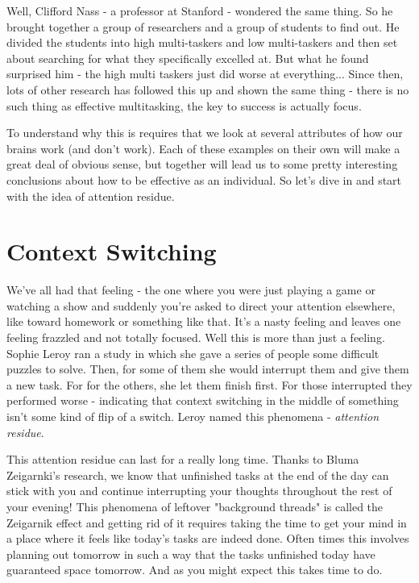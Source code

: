 \documentclass[11pt,a5paper]{book}
\begin{document}
Well, Clifford Nass - a professor at Stanford - wondered the same thing. So he brought together a group of researchers and a group of students to find out. He divided the students into high multi-taskers and low multi-taskers and then set about searching for what they specifically excelled at. But what he found surprised him - the high multi taskers just did worse at everything... Since then, lots of other research has followed this up and shown the same thing - there is no such thing as effective multitasking, the key to success is actually focus. \cite{keller}
\newline

To understand why this is requires that we look at several attributes of how our brains work (and don't work). Each of these examples on their own will make a great deal of obvious sense, but together will lead us to some pretty interesting conclusions about how to be effective as an individual. So let's dive in and start with the idea of attention residue.

\section{Context Switching}

We've all had that feeling - the one where you were just playing a game or watching a show and suddenly you're asked to direct your attention elsewhere, like toward homework or something like that. It's a nasty feeling and leaves one feeling frazzled and not totally focused. Well this is more than just a feeling. Sophie Leroy ran a study in which she gave a series of people some difficult puzzles to solve. Then, for some of them she would interrupt them and give them a new task. For for the others, she let them finish first. For those interrupted they performed worse - indicating that context switching in the middle of something isn't some kind of flip of a switch. Leroy named this phenomena - \textit{attention residue}. 
\newline

This attention residue can last for a really long time. Thanks to Bluma Zeigarnki's research, we know that unfinished tasks at the end of the day can stick with you and continue interrupting your thoughts throughout the rest of your evening! This phenomena of leftover "background threads" is called the Zeigarnik effect \cite{newport} and getting rid of it requires taking the time to get your mind in a place where it feels like today's tasks are indeed done. Often times this involves planning out tomorrow in such a way that the tasks unfinished today have guaranteed space tomorrow. And as you might expect this takes time to do. 
\newline
\end{document}
